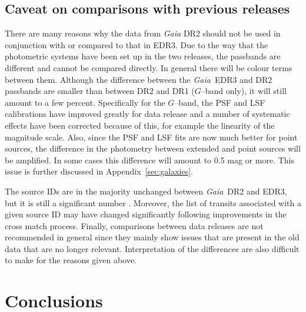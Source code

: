 \documentclass{aa}
\newcommand{\gaia}{\textit{Gaia}\xspace}
\newcommand{\gband}{$G$--band\xspace}
\newcommand{\drt}{\gaia~DR2\xspace}
\newcommand{\edr}{\gaia~EDR3\xspace}
\newcommand{\appref}[1]{Appendix~\ref{sec:#1}}
\begin{document}
\subsection{Caveat on comparisons with previous releases}\label{sec:dontmix}

There are many reasons why the data from \gaia DR2 should not be used in conjunction with or compared to that in EDR3.
%
Due to the way that the photometric systems have been set up in the two releases, the passbands are different and cannot be compared directly. In general there will be colour terms between them. Although the difference between the \edr and DR2 passbands are smaller than between DR2 and DR1 (\gband only), it will still amount to a few percent.
%
Specifically for the \gband, the PSF and LSF calibrations \citep{EDR3_PSF} have improved greatly for data release and a number of systematic effects have been corrected because of this, for example the linearity of the magnitude scale.
Also, since the PSF and LSF fits are now much better for point sources, the difference in the photometry between extended and point sources will be amplified. In some cases this difference will amount to 0.5 mag or more. This issue is further discussed in \appref{galaxies}.

The source IDs are in the majority unchanged between \drt and EDR3, but it is still a significant number \citep[see Sect. 7 of][for a detailed discussion]{EDR3_XM}. Moreover, the list of transits associated with a given source ID may have changed significantly following improvements in the cross match process.
%
Finally, comparisons between data releases are not recommended in general since they mainly show issues that are present in the old data that are no longer relevant. Interpretation of the differences are also difficult to make for the reasons given above.

\section{Conclusions}\label{sec:end}
\end{document}
